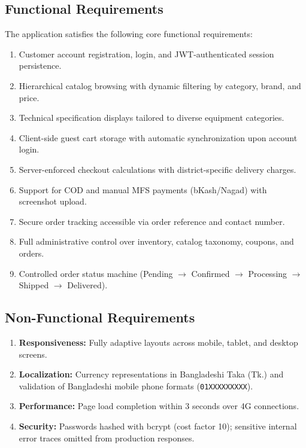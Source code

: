 \documentclass[12pt,a4paper,oneside]{report}
\begin{document}
\subsection{Functional Requirements}
The application satisfies the following core functional requirements:
\begin{enumerate}
    \item Customer account registration, login, and JWT-authenticated session persistence.
    \item Hierarchical catalog browsing with dynamic filtering by category, brand, and price.
    \item Technical specification displays tailored to diverse equipment categories.
    \item Client-side guest cart storage with automatic synchronization upon account login.
    \item Server-enforced checkout calculations with district-specific delivery charges.
    \item Support for COD and manual MFS payments (bKash/Nagad) with screenshot upload.
    \item Secure order tracking accessible via order reference and contact number.
    \item Full administrative control over inventory, catalog taxonomy, coupons, and orders.
    \item Controlled order status machine (Pending $\rightarrow$ Confirmed $\rightarrow$ Processing $\rightarrow$ Shipped $\rightarrow$ Delivered).
\end{enumerate}

\subsection{Non-Functional Requirements}
\begin{enumerate}
    \item \textbf{Responsiveness:} Fully adaptive layouts across mobile, tablet, and desktop screens.
    \item \textbf{Localization:} Currency representations in Bangladeshi Taka (Tk.) and validation of Bangladeshi mobile phone formats (\texttt{01XXXXXXXXX}).
    \item \textbf{Performance:} Page load completion within 3 seconds over 4G connections.
    \item \textbf{Security:} Passwords hashed with bcrypt (cost factor 10); sensitive internal error traces omitted from production responses.
\end{enumerate}
\end{document}
